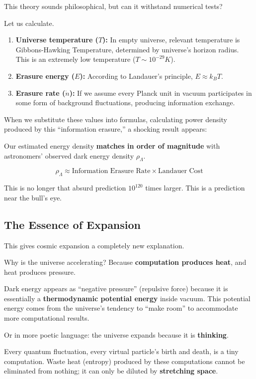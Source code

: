 \documentclass[11pt,a4paper,twoside]{book}
\begin{document}
This theory sounds philosophical, but can it withstand numerical tests?

Let us calculate.

\begin{enumerate}
\item \textbf{Universe temperature ($T$):} In empty universe, relevant temperature is Gibbons-Hawking Temperature, determined by universe's horizon radius. This is an extremely low temperature ($T \sim 10^{-29} K$).

\item \textbf{Erasure energy ($E$):} According to Landauer's principle, $E \approx k_B T$.

\item \textbf{Erasure rate ($\dot{n}$):} If we assume every Planck unit in vacuum participates in some form of background fluctuations, producing information exchange.
\end{enumerate}

When we substitute these values into formulas, calculating power density produced by this ``information erasure,'' a shocking result appears:

Our estimated energy density \textbf{matches in order of magnitude} with astronomers' observed dark energy density $\rho_{\Lambda}$.

$$\rho_{\Lambda} \approx \text{Information Erasure Rate} \times \text{Landauer Cost}$$

This is no longer that absurd prediction $10^{120}$ times larger. This is a prediction near the bull's eye.

\subsection{The Essence of Expansion}

This gives cosmic expansion a completely new explanation.

Why is the universe accelerating? Because \textbf{computation produces heat}, and heat produces pressure.

Dark energy appears as ``negative pressure'' (repulsive force) because it is essentially a \textbf{thermodynamic potential energy} inside vacuum. This potential energy comes from the universe's tendency to ``make room'' to accommodate more computational results.

Or in more poetic language: the universe expands because it is \textbf{thinking}.

Every quantum fluctuation, every virtual particle's birth and death, is a tiny computation. Waste heat (entropy) produced by these computations cannot be eliminated from nothing; it can only be diluted by \textbf{stretching space}.
\end{document}

